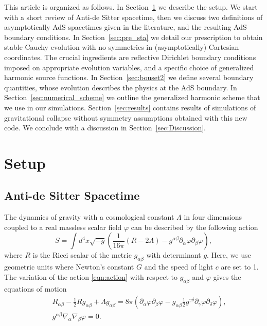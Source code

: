 \documentclass[a4paper,11pt]{article}
\numberwithin{equation}{section}
\begin{document}
This article is organized as follows. 
In Section~\ref{sec:setup} we describe the setup. We start with a short review of Anti-de Sitter spacetime, then we discuss two definitions of asymptotically AdS spacetimes given in the literature, and the resulting AdS boundary conditions.
In Section~\ref{sec:pre_sta} we detail our prescription to obtain stable Cauchy evolution with no symmetries in (asymptotically) Cartesian coordinates. The crucial ingredients are reflective Dirichlet boundary conditions imposed on appropriate evolution variables, and a specific choice of generalized harmonic source functions.
In Section~\ref{sec:bouset2} we define several boundary quantities, whose evolution describes the physics at the AdS boundary.
In Section~\ref{sec:numerical_scheme} we outline the generalized harmonic scheme that we use in our simulations. 
Section~\ref{sec:results} contains results of simulations of gravitational collapse without symmetry assumptions obtained with this new code. We conclude with a discussion in Section~\ref{sec:Discussion}.

\section{Setup}\label{sec:setup}

\subsection{Anti-de Sitter Spacetime}\label{subsec:AdS}
The dynamics of gravity with a cosmological constant $\Lambda$ in four dimensions coupled to a real massless scalar field $\varphi$ can be described by the following action
\begin{equation}\label{eqn:action}
S = \int d^4 x \sqrt{-g} \left( \frac{1}{16\pi} \left( R - 2\Lambda \right) - g^{\alpha\beta} \partial_\alpha \varphi \partial_\beta \varphi \right),
\end{equation}
where $R$ is the Ricci scalar of the metric $g_{\alpha\beta}$ with determinant $g$.
Here, we use geometric units where Newton's constant $G$ and the speed of light $c$ are set to 1.
The variation of the action \eqref{eqn:action} with respect to $g_{\alpha\beta}$ and $\varphi$ gives the equations of motion
\begin{eqnarray}
\label{eqn:eoms1}
&&R_{\alpha\beta} - \frac{1}{2} R g_{\alpha\beta} + \Lambda g_{\alpha\beta} = 8\pi \left( \partial_\alpha \varphi \partial_\beta \varphi - g_{\alpha\beta} \frac{1}{2} g^{\gamma\delta} \partial_{\gamma} \varphi \partial_{\delta} \varphi \right),\\
\label{eqn:eoms2}
&&g^{\alpha\beta} \nabla_{\alpha} \nabla_{\beta} \varphi = 0.
\end{eqnarray}
\end{document}
